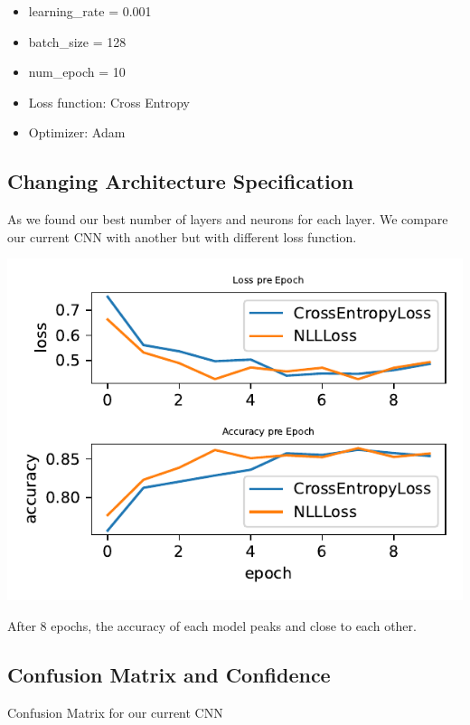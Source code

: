 \documentclass[11pt]{article}
\begin{document}
\begin{itemize}
    \item learning\_rate = 0.001
    \item batch\_size = 128
    \item num\_epoch = 10
    \item Loss function: Cross Entropy
    \item Optimizer: Adam
\end{itemize}

\subsection{Changing Architecture Specification}

As we found our best number of layers and neurons for each layer. We compare our current CNN with another but with different loss function.

\includegraphics{figures/2c[1]_dnn_loss_epoch.pdf}

After 8 epochs, the accuracy of each model peaks and close to each other.

\subsection{Confusion Matrix and Confidence}

Confusion Matrix for our current CNN
\end{document}
